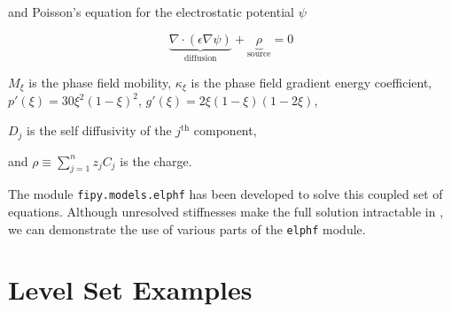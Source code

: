 \documentclass[tocAsPDFpart]{fipy}
\begin{document}
and Poisson's equation for the electrostatic potential \( \psi \)

\[ 
    \underbrace{
	\nabla\cdot\left(\epsilon\nabla\psi\right) 
    }_{\text{diffusion}}
    +
    \underbrace{
	\rho
    }_{\text{source}}
    = 0
\]

\( M_\xi \) is the phase field mobility, \( \kappa_\xi \) is the
phase field gradient energy coefficient, \( p'(\xi) =
30\xi^2\left(1-\xi\right)^2 \), \( g'(\xi) =
2\xi\left(1-\xi\right)\left(1-2\xi\right) \), 

\( D_{j} \) is the self diffusivity of the \( j^{\text{th}} \)
component, 

and \( \rho \equiv \sum_{j=1}^n z_j C_j \) is the charge.

The module \verb+fipy.models.elphf+ has been developed to solve this
coupled set of equations.  Although unresolved stiffnesses make the
full solution intractable in \FiPy{}, we can demonstrate the use of
various parts of the \verb+elphf+ module.




% 
% 
% 
% 


% 



\chapter{Level Set Examples}


% 

% 


\end{document}
